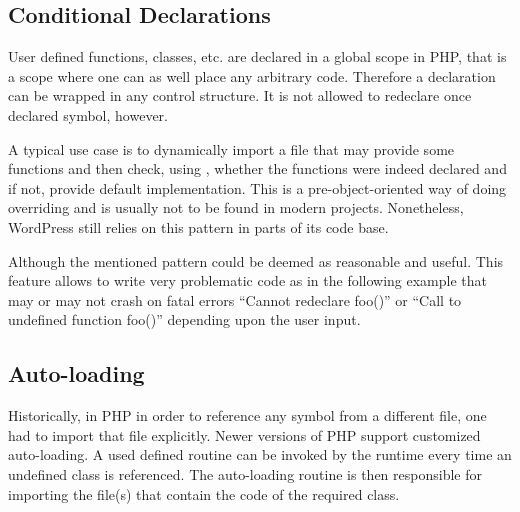     
    
    \subsection{Conditional Declarations}
    User defined functions, classes, etc. are declared in 
    a global scope in PHP, that is a scope where one can 
    as well place any arbitrary code. Therefore a declaration 
    can be wrapped in any control structure. 
    It is not allowed to redeclare once declared symbol, however.
    
    A typical use case is to dynamically import a file 
    that may provide some functions and then check, 
    using , whether the functions were 
    indeed declared and if not, provide default implementation.
    This is a pre-object-oriented way of doing overriding and 
    is usually not to be found in modern projects. Nonetheless, 
    WordPress still relies on this pattern in parts of its code base.
    
    Although the mentioned pattern could be deemed as 
    reasonable and useful. This feature allows 
    to write very problematic code as in the following example 
    that may or may not crash on fatal errors ``Cannot 
    redeclare foo()'' or ``Call to undefined function foo()'' 
    depending upon the user input.
    
    
                
    \subsection{Auto-loading}
    Historically, in PHP in order to reference any symbol 
    from a different file, one had to import that 
    file explicitly. Newer versions of PHP support  
    customized auto-loading. A used defined routine 
    can be invoked by the runtime every time an 
    undefined class is referenced. 
    The auto-loading routine is then responsible for 
    importing the file(s) that contain the code of the 
    required class. 
    

